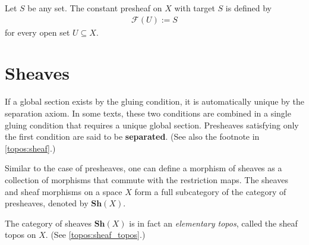     \begin{example}\label{sheaf:constant_presheaf}
        Let $S$ be any set. The constant presheaf on $X$ with target $S$ is defined by
        \begin{gather}
            \mathcal{F}(U) := S
        \end{gather}
        for every open set $U\subseteq X$.
    \end{example}

\section{Sheaves}

    \begin{remark}
        If a global section exists by the gluing condition, it is automatically unique by the separation axiom. In some texts, these two conditions are combined in a single gluing condition that requires a unique global section. Presheaves satisfying only the first condition are said to be \textbf{separated}. (See also the footnote in \cref{topos:sheaf}.)
    \end{remark}

    \begin{notation}
        Similar to the case of presheaves, one can define a morphism of sheaves as a collection of morphisms that commute with the restriction maps. The sheaves and sheaf morphisms on a space $X$ form a full subcategory of the category of presheaves, denoted by $\mathbf{Sh}(X)$.
    \end{notation}
    \begin{property}
        The category of sheaves $\mathbf{Sh}(X)$ is in fact an \textit{elementary topos}, called the sheaf topos on $X$. (See \cref{topos:sheaf_topos}.)
    \end{property}


